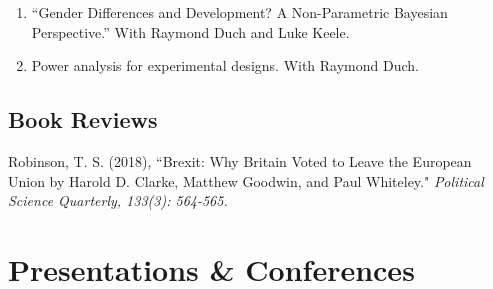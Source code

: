 \documentclass[11pt, a4paper]{article}
\begin{document}
\begin{enumerate}
\item ``Gender Differences and Development? A Non-Parametric Bayesian Perspective.'' With Raymond Duch and Luke Keele. 

\item Power analysis for experimental designs.  With Raymond Duch.
\end{enumerate}

 \subsection*{Book Reviews}

  Robinson, T. S. (2018), ``Brexit: Why Britain Voted to Leave the European Union by Harold D. Clarke, Matthew Goodwin, and Paul Whiteley."\textit{ Political Science Quarterly, 133(3): 564-565.}

 \section*{Presentations \& Conferences}
\end{document}

